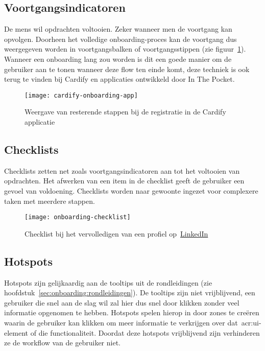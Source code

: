 \subsection{Voortgangsindicatoren}
\label{sec:onboarding:voortgang}

De mens wil opdrachten voltooien. Zeker wanneer men de voortgang kan opvolgen. Doorheen het volledige onboarding-proces kan de voortgang dus weergegeven worden in voortgangsbalken of voortgangsstippen (zie figuur~\ref{fig:onboarding:voortgang}). Wanneer een onboarding lang zou worden is dit een goede manier om de gebruiker aan te tonen wanneer deze flow ten einde komt, deze techniek is ook terug te vinden bij Cardify en applicaties ontwikkeld door In The Pocket.

\begin{figure}[h!]
    \centering
    \texttt{[image: cardify-onboarding-app]}
    \caption[Voorbeeld voortgangsindicatoren]{Weergave van resterende stappen bij de registratie in de Cardify applicatie}
    \label{fig:onboarding:voortgang}
\end{figure}

\subsection{Checklists}
\label{sec:onboarding:checklists}

Checklists zetten net zoals voortgangsindicatoren aan tot het voltooien van opdrachten. Het afwerken van een item in de checklist geeft de gebruiker een gevoel van voldoening. Checklists worden naar gewoonte ingezet voor complexere taken met meerdere stappen.

\begin{figure}[h!]
    \centering
    \texttt{[image: onboarding-checklist]}
    \caption[Voorbeeld checklist]{Checklist bij het vervolledigen van een profiel op~\href{https://www.linkedin.com/}{LinkedIn}}
    \label{fig:onboarding:checklist}
\end{figure}

\subsection{Hotspots}
\label{sec:onboarding:hotspots}

Hotspots zijn gelijkaardig aan de tooltips uit de rondleidingen (zie hoofdstuk~\ref{sec:onboarding:rondleidingen}). De tooltips zijn niet vrijblijvend, een gebruiker die snel aan de slag wil zal hier dus snel door klikken zonder veel informatie opgenomen te hebben. Hotspots spelen hierop in door zones te creëren waarin de gebruiker kan klikken om meer informatie te verkrijgen over dat~\acrshort{acr:ui}-element of die functionaliteit. Doordat deze hotspots vrijblijvend zijn verhinderen ze de workflow van de gebruiker niet.

